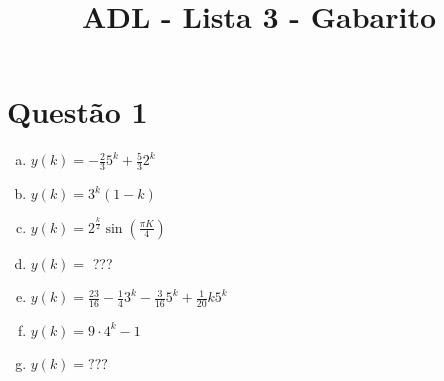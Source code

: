 \documentclass[a4paper,10pt]{article}
\title{ADL - Lista 3 - Gabarito}
\author{}
\begin{document}
\maketitle
\section{Questão 1}


\begin{enumerate}[a)]
 \item $ y(k) = -\frac{2}{3}5^k + \frac{5}{3}2^k$
 \item$y(k) = 3^k(1 - k) $
 \item $y(k) = 2 ^{\frac{k}{2}}\sin (\frac{\pi K}{4})$
\item $y(k) = $ ???
\item $y(k) = \frac{23}{16} - \frac{1}{4}3^k -\frac{3}{16}5^k +
\frac{1}{20}k5^k$
\item $y(k) = 9 \cdot 4^k - 1$
\item $y(k) = ???$
 \end{enumerate}



 
\end{document}
